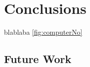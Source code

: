 \section*{Conclusions}

blablaba \ref{fig:computerNo}
\blindtext

\subsection*{Future Work}
\blindtext
